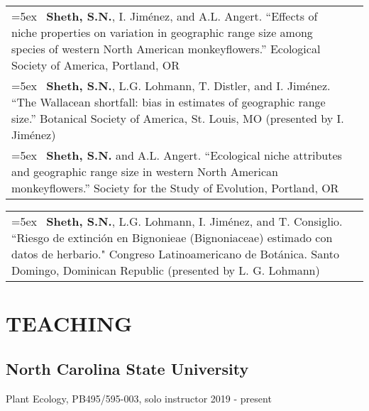 \documentclass[11pt,english]{article}\usepackage[]{graphicx}\usepackage[]{color}
\providecommand{\tabularnewline}{\\}
\begin{document}
\begin{samepage}
\begin{tabularx}{\textwidth}{@{}>{\raggedright}p{5.25in} >{\raggedleft}X@{}}
\hangindent=5ex \ \textbf{Sheth, S.N.}, I. Jim\'enez, and A.L. Angert. ``Effects of niche properties on variation in geographic range size among species of western North American monkeyflowers.'' Ecological Society of America, Portland, OR & 2012 \tabularnewline

\hangindent=5ex \ \textbf{Sheth, S.N.}, L.G. Lohmann, T. Distler, and I. Jim\'enez. ``The Wallacean shortfall: bias in estimates of geographic range size.'' Botanical Society of America, St. Louis, MO (presented by I. Jim\'enez) & 2011 \tabularnewline

\hangindent=5ex \ \textbf{Sheth, S.N.} and A.L. Angert. ``Ecological niche attributes and geographic range size in western North American monkeyflowers.'' Society for the Study of Evolution, Portland, OR & 2010 \tabularnewline

\end{tabularx}
\end{samepage}

\renewcommand{\arraystretch}{1.2} 
\begin{tabularx}{\textwidth}{@{}>{\raggedright}p{5.25in} >{\raggedleft}X@{}}

\hangindent=5ex \ \textbf{Sheth, S.N.}, L.G. Lohmann, I. Jim\'enez, and T. Consiglio. ``Riesgo de extinci\'on en Bignonieae (Bignoniaceae) estimado con datos de herbario." Congreso Latinoamericano de Bot\'anica. Santo Domingo, Dominican Republic (presented by L. G. Lohmann) & 2006 \tabularnewline 

\end{tabularx}

\section*{TEACHING}

\subsection*{North Carolina State University}
Plant Ecology, PB495/595-003, solo instructor \hfill {2019 - present} 
\end{document}
